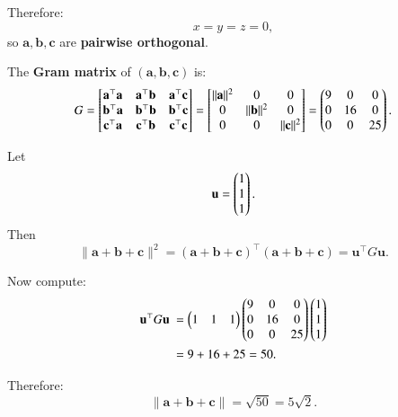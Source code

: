 \documentclass[journal]{IEEEtran}
\begin{document}
Therefore:
\begin{equation} \label{eq9}
x = y = z = 0,
\end{equation}
so $\mathbf{a}, \mathbf{b}, \mathbf{c}$ are \textbf{pairwise orthogonal}.

\bigskip

The \textbf{Gram matrix} of $ (\mathbf{a}, \mathbf{b}, \mathbf{c}) $ is:
\begin{equation} \label{eq10}
G =
\begin{bmatrix}
\mathbf{a}^\top \mathbf{a} & \mathbf{a}^\top \mathbf{b} & \mathbf{a}^\top \mathbf{c} \\
\mathbf{b}^\top \mathbf{a} & \mathbf{b}^\top \mathbf{b} & \mathbf{b}^\top \mathbf{c} \\
\mathbf{c}^\top \mathbf{a} & \mathbf{c}^\top \mathbf{b} & \mathbf{c}^\top \mathbf{c}
\end{bmatrix}
=
\begin{bmatrix}
\|\mathbf{a}\|^2 & 0 & 0 \\
0 & \|\mathbf{b}\|^2 & 0 \\
0 & 0 & \|\mathbf{c}\|^2
\end{bmatrix}
=
\begin{pmatrix}
9 & 0 & 0 \\
0 & 16 & 0 \\
0 & 0 & 25
\end{pmatrix}.
\end{equation}

Let
\[
\mathbf{u} = \begin{pmatrix}1 \\ 1 \\ 1\end{pmatrix}.
\]
Then
\begin{equation} \label{eq11}
\|\mathbf{a} + \mathbf{b} + \mathbf{c}\|^2 = (\mathbf{a} + \mathbf{b} + \mathbf{c})^\top (\mathbf{a} + \mathbf{b} + \mathbf{c}) = \mathbf{u}^\top G \mathbf{u}.
\end{equation}

Now compute:
\begin{align}
\mathbf{u}^\top G \mathbf{u} 
&= \myvec{1 & 1 & 1}
\myvec{
9 & 0 & 0 \\
0 & 16 & 0 \\
0 & 0 & 25
}
\myvec{1 \\ 1 \\ 1} \nonumber \\
&= 9 + 16 + 25 = 50. \label{eq12}
\end{align}

Therefore:
\begin{equation} \label{eq13}
\|\mathbf{a} + \mathbf{b} + \mathbf{c}\| = \sqrt{50} = 5\sqrt{2}.
\end{equation}
\end{document}
